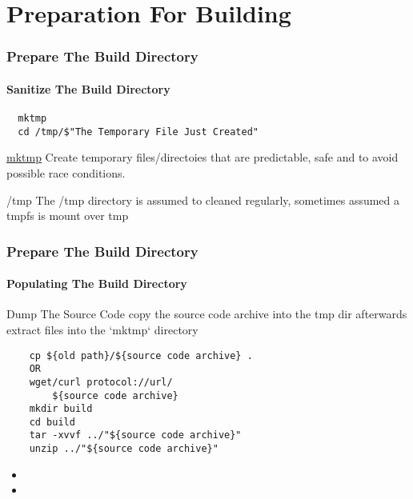 \documentclass[12pt,hyperref={pdfpagelabels=true}]{beamer}
\begin{document}
\section{Preparation For Building}

\begin{frame}[fragile]
  \frametitle{Prepare The Build Directory}
  \framesubtitle{Sanitize The Build Directory}
  \lstset{language=sh}
  \begin{lstlisting}
  mktmp
  cd /tmp/$"The Temporary File Just Created"
  \end{lstlisting}
  
  \begin{alertblock}{\href{http://unixhelp.ed.ac.uk/CGI/man-cgi?mktemp}{mktmp}}
  Create temporary files/directoies that are predictable, safe and to avoid possible race conditions.
  \end{alertblock}
  
   \begin{alertblock}{/tmp}
   The /tmp directory is assumed to cleaned regularly, sometimes assumed a tmpfs is mount over tmp
  \end{alertblock}
\end{frame}

\begin{frame}[fragile]
  \frametitle{Prepare The Build Directory}
  \framesubtitle{Populating The Build Directory}
  \lstset{language=sh}
    \begin{alertblock}{Dump The Source Code}
      copy the source code archive into the tmp dir 
      afterwards extract files into the `mktmp` directory
  \end{alertblock}
  
  \begin{lstlisting}
    cp ${old path}/${source code archive} .
    OR
    wget/curl protocol://url/
        ${source code archive}
    mkdir build
    cd build
    tar -xvvf ../"${source code archive}"
    unzip ../"${source code archive}"
  \end{lstlisting}
\end{frame}



\begin{frame}
  \begin{example}
  \begin{itemize}
    \item 
    \item 
  \end{itemize}
  \end{example}
\end{frame}
\end{document}
